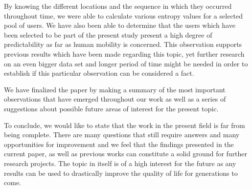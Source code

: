 By knowing the different locations and the sequence in which they occurred
throughout time, we were able to calculate various entropy values for a selected
pool of users. We have also been able to determine that the users which have
been selected to be part of the present study present a high degree of
predictability as far as human mobility is concerned. This observation supports
previous results which have been made regarding this topic, yet further research
on an even bigger data set and longer period of time might be needed in order to
establish if this particular observation can be considered a fact.

We have finalized the paper by making a summary of the most important
observations that have emerged throughout our work as well as a series of
suggestions about possible future areas of interest for the present topic.

To conclude, we would like to state that the work in the present field is far
from being complete. There are many questions that still require answers and
many opportunities for improvement and we feel that the findings presented in
the current paper, as well as previous works can constitute a solid ground for
further research projects. The topic in itself is of a high interest for the
future as any results can be used to drastically improve the quality of life for
generations to come.